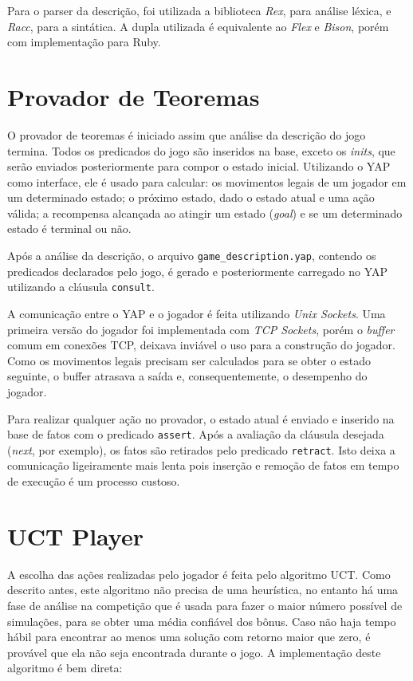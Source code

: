  Para o parser da descrição, foi utilizada a biblioteca \textit{Rex}, para análise léxica, e \textit{Racc}, para a sintática. A dupla utilizada é equivalente ao \textit{Flex} e \textit{Bison}, porém com implementação para Ruby.
 
 
 \section{Provador de Teoremas}
 O provador de teoremas é iniciado assim que análise da descrição do jogo termina. Todos os predicados do jogo são inseridos na base, exceto os \textit{inits}, que serão enviados posteriormente para compor o estado inicial. Utilizando o YAP como interface, ele é usado para calcular: os movimentos legais de um jogador em um determinado estado; o próximo estado, dado o estado atual e uma ação válida; a recompensa alcançada ao atingir um estado (\textit{goal}) e se um determinado estado é terminal ou não.
 
 Após a análise da descrição, o arquivo \texttt{game\_description.yap}, contendo os predicados declarados pelo jogo, é gerado e posteriormente carregado no YAP utilizando a cláusula \texttt{consult}. 
 
 A comunicação entre o YAP e o jogador é feita utilizando \textit{Unix Sockets}. Uma primeira versão do jogador foi implementada com \textit{TCP Sockets}, porém o \textit{buffer} comum em conexões TCP, deixava inviável o uso para a construção do jogador. Como os movimentos legais precisam ser calculados para se obter o estado seguinte, o buffer atrasava a saída e, consequentemente, o desempenho do jogador.
 
Para realizar qualquer ação no provador, o estado atual é enviado e inserido na base de fatos com o predicado \texttt{assert}. Após a avaliação da cláusula desejada (\textit{next}, por exemplo), os fatos são retirados pelo predicado \texttt{retract}. Isto deixa a comunicação ligeiramente mais lenta  pois inserção e remoção de fatos em tempo de execução é um processo custoso.
 

\section{UCT Player} 
A escolha das ações realizadas pelo jogador é feita pelo algoritmo UCT. Como descrito antes, este algoritmo não precisa de uma heurística, no entanto há uma fase de análise na competição que é usada para fazer o maior número possível de simulações, para se obter uma média confiável dos bônus. Caso não haja tempo hábil para encontrar ao menos uma solução com retorno maior que zero, é provável que ela não seja encontrada durante o jogo. A implementação deste algoritmo é bem direta:


